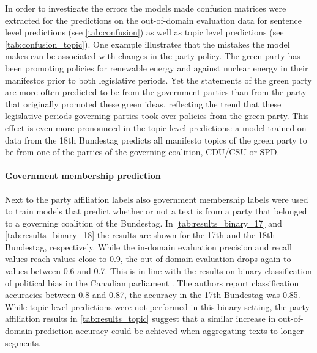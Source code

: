 \documentclass[runningheads,a4paper]{llncs}
\begin{document}
In order to investigate the errors the models made confusion matrices were extracted for the predictions on the out-of-domain evaluation data for sentence level predictions (see \autoref{tab:confusion}) as well as topic level predictions (see \autoref{tab:confusion_topic}). One example illustrates that the mistakes the model makes can be associated with changes in the party policy. The green party has been promoting policies for renewable energy and against nuclear energy in their manifestos prior to both legislative periods. Yet the statements of the green party are more often predicted to be from the government parties than from the party that originally promoted these green ideas, reflecting the trend that these legislative periods governing parties took over policies from the green party. This effect is even more pronounced in the topic level predictions: a model trained on data from the 18th Bundestag predicts all manifesto topics of the green party to be from one of the parties of the governing coalition, CDU/CSU or SPD. \\

\paragraph{Government membership prediction} Next to the party affiliation labels also government membership labels were used to train models that predict whether or not a text is from a party that belonged to a governing coalition of the Bundestag. In \autoref{tab:results_binary_17} and \autoref{tab:results_binary_18} the results are shown for the 17th and the 18th Bundestag, respectively. While the in-domain evaluation precision and recall values reach values close to 0.9, the out-of-domain evaluation drops again to values between 0.6 and 0.7. This is in line with the results on binary classification of political bias in the Canadian parliament \cite{Yu2008}. The authors report classification accuracies between 0.8 and 0.87, the accuracy in the 17th Bundestag was 0.85. While topic-level predictions were not performed in this binary setting, the party affiliation results in \autoref{tab:results_topic} suggest that a similar increase in out-of-domain prediction accuracy could be achieved when aggregating texts to longer segments. 
\end{document}
